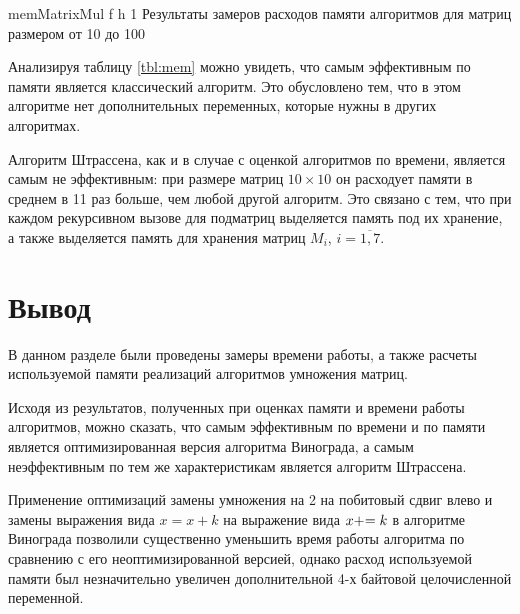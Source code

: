 \clearpage

{memMatrixMul} %
{f} %
{h} %
{1\textwidth} %
{Результаты замеров расходов памяти алгоритмов для матриц размером от 10 до 100} %

Анализируя таблицу \ref{tbl:mem} можно увидеть, что самым эффективным по памяти является классический алгоритм. Это обусловлено тем, что в этом алгоритме нет дополнительных переменных, которые нужны в других алгоритмах.

Алгоритм Штрассена, как и в случае с оценкой алгоритмов по времени, является самым не эффективным: при размере матриц $10 \times 10$ он расходует памяти в среднем в 11 раз больше, чем любой другой алгоритм. 
Это связано с тем, что при каждом рекурсивном вызове для подматриц выделяется память под их хранение, а также выделяется память для хранения матриц $M_i$, $i = \overline{1, 7}$.

\clearpage

\section*{Вывод}


В данном разделе были проведены замеры времени работы, а также расчеты используемой памяти реализаций алгоритмов умножения матриц. 

Исходя из результатов, полученных при оценках памяти и времени работы алгоритмов, можно сказать, что самым эффективным по времени и по памяти является оптимизированная версия алгоритма Винограда, а самым неэффективным по тем же характеристикам является алгоритм Штрассена.

Применение оптимизаций замены умножения на 2 на побитовый сдвиг влево и замены выражения вида $x = x + k$ на выражение вида $x +\kern-0.25em= k$ в алгоритме Винограда позволили существенно уменьшить время работы алгоритма по сравнению с его неоптимизированной версией, однако расход используемой памяти был незначительно увеличен дополнительной 4-х байтовой целочисленной переменной.
